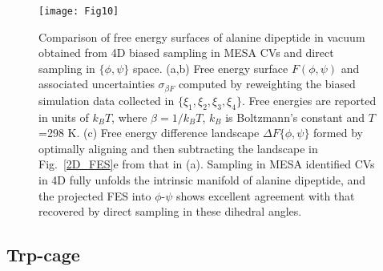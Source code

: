 \documentclass[12pt]{article}
\newcommand*{\blauw}[1]{#1}
\begin{document}
\begin{figure}[ht!]
\begin{center}
\texttt{[image: Fig10]} 
\caption{Comparison of free energy surfaces of alanine dipeptide in vacuum obtained from 4D biased sampling in MESA CVs and direct sampling in $\{\phi,\psi\}$ space.  (a,b) Free energy surface $F(\phi,\psi)$ and associated uncertainties $\sigma_{\beta F}$ computed by reweighting the biased simulation data collected in $\{\xi_1,\xi_2, \xi_3,\xi_4\}$. Free energies are reported in units of $k_B T$, where $\beta = 1/k_B T$, $k_B$ is Boltzmann's constant and $T$=298 K. (c) Free energy difference landscape $\Delta F\{\phi,\psi\}$ formed by optimally aligning and then subtracting the landscape in \blauw{Fig.~\ref{2D_FES}e} from that in (a). Sampling in MESA identified CVs in 4D fully unfolds the intrinsic manifold of alanine dipeptide, and the projected FES into $\phi$-$\psi$ shows excellent agreement with that recovered by direct sampling in these dihedral angles.}
\label{4D_FES}
\end{center}
\end{figure}





\subsection{\sffamily \large Trp-cage}
\end{document}
